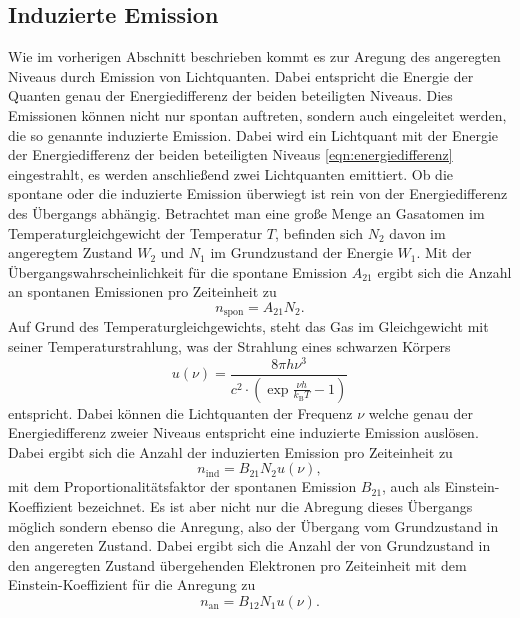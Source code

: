 \subsection{Induzierte Emission}
\label{sec:emission}
Wie im vorherigen Abschnitt beschrieben kommt es zur Aregung des angeregten
Niveaus durch Emission von Lichtquanten. Dabei entspricht die Energie der Quanten genau der 
Energiedifferenz der beiden beteiligten Niveaus. Dies Emissionen können nicht nur
spontan auftreten, sondern auch eingeleitet werden, die so genannte induzierte Emission.
Dabei wird ein Lichtquant mit der Energie der Energiedifferenz der beiden beteiligten 
Niveaus \eqref{eqn:energiedifferenz} eingestrahlt, es werden anschließend zwei Lichtquanten emittiert. Ob die spontane
oder die induzierte Emission  überwiegt ist rein von der Energiedifferenz des Übergangs abhängig.
Betrachtet man eine große Menge an Gasatomen im Temperaturgleichgewicht der Temperatur $T$, befinden 
sich $N_2$ davon im angeregtem Zustand $W_2$ und $N_1$ im Grundzustand der Energie $W_1$.
Mit der Übergangswahrscheinlichkeit für die spontane Emission $A_{21}$ ergibt sich die Anzahl an 
spontanen Emissionen pro Zeiteinheit zu
\begin{equation*}
  n_\text{spon} = A_{21} N_2.
\end{equation*}
Auf Grund des Temperaturgleichgewichts, steht das Gas im Gleichgewicht mit seiner
Temperaturstrahlung, was der Strahlung eines schwarzen Körpers
\begin{equation*}
  u(\nu) = \frac{8 \pi h \nu^3}{c^2 \cdot \left(\exp{\frac{\nu h}{k_\text{B} T}} -1 \right)}
\end{equation*}
entspricht. Dabei können die Lichtquanten der Frequenz $\nu$ welche genau der Energiedifferenz zweier Niveaus entspricht
eine induzierte Emission auslösen. Dabei ergibt sich die Anzahl der induzierten Emission pro Zeiteinheit zu 
\begin{equation*}
  n_\text{ind} = B_{21} N_2 u(\nu),
\end{equation*}
mit dem Proportionalitätsfaktor der spontanen Emission $B_{21}$, auch als Einstein-Koeffizient bezeichnet.
Es ist aber nicht nur die Abregung dieses Übergangs möglich sondern ebenso die Anregung, also der Übergang
vom Grundzustand in den angereten Zustand. Dabei ergibt sich die Anzahl der von Grundzustand in den angeregten Zustand
übergehenden Elektronen pro Zeiteinheit mit dem Einstein-Koeffizient für die Anregung zu
\begin{equation*}
  n_\text{an} = B_{12} N_1 u(\nu).
\end{equation*}
